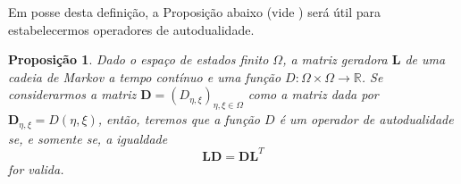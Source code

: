\documentclass[twoside,openright,titlepage,numbers=noenddot,headinclude,  lineheaders footinclude=true,cleardoublepage=empty,
                                BCOR=5mm,paper=a4,fontsize=12pt ]{scrbook}
\newtheorem{teo}{Teorema}[chapter]
\newtheorem{prop}[teo]{Proposição}
\theoremstyle{definition}
\begin{document}
Em posse desta definição, a Proposição abaixo (vide \cite{dual2}) será útil para estabelecermos operadores de autodualidade.
\begin{prop}
Dado o espaço de estados finito $\Omega$, a matriz geradora $\bm{L}$ de uma cadeia de Markov a tempo contínuo
e uma função $D: \Omega \times \Omega \rightarrow \mathbb{R}$. Se considerarmos a matriz
$\bm{D} = (D_{\eta, \xi})_{\eta, \xi \in \Omega}$ como a matriz dada por  $\bm{D}_{\eta, \xi} = D(\eta, \xi)$,
então, teremos que a função $D$ é um operador de autodualidade se, e somente se, a igualdade 
\[
\bm{L} \bm{D} = \bm{D} \bm{L}^T
\]
for valida.
\end{prop}
\end{document}
